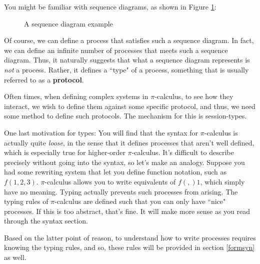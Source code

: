 You might be familiar with sequence diagrams, as shown in Figure \ref{seqdiaexp}:
\begin{figure}
\caption{\label{seqdiaexp} A sequence diagram example}
\end{figure}

Of course, we can define a process that satisfies such a sequence diagram. In fact, we can define an infinite number of processes that meets such a sequence diagram. Thus, it naturally suggests that what a sequence diagram represents is \textit{not} a process. Rather, it defines a ``type" of a process, something that is usually referred to as a \textbf{protocol}.

Often times, when defining complex systems in $\pi$-calculus, to see how they interact, we wish to define them against some specific protocol, and thus, we need some method to define such protocols. The mechanism for this is session-types.

One last motivation for types: You will find that the syntax for $\pi$-calculus is actually quite \textit{loose}, in the sense that it defines processes that aren't well defined, which is especially true for higher-order $\pi$-calculus. It's difficult to describe precisely without going into the syntax, so let's make an analogy. Suppose you had some rewriting system that let you define function notation, such as $f(1,2,3)$. $\pi$-calculus allows you to write equivalents of $f(,)1$, which simply have no meaning. Typing actually prevents such processes from arising. The typing rules of $\pi$-calculus are defined such that you can only have ``nice" processes. If this is too abstract, that's fine. It will make more sense as you read through the syntax section.

Based on the latter point of reason, to understand how to write processes requires knowing the typing rules, and so, these rules will be provided in section \ref{formsyn} as well.

